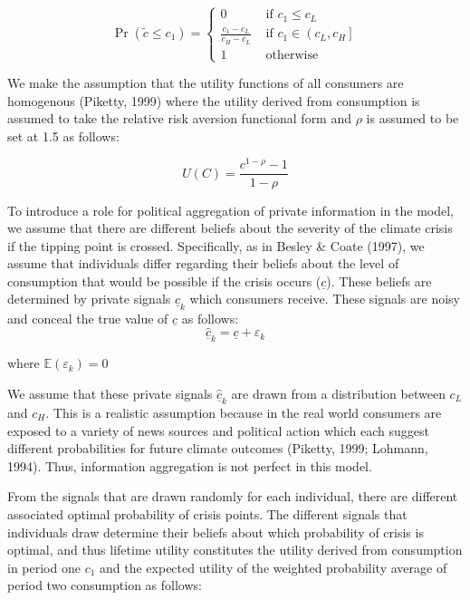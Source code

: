 \documentclass[11pt,preprint, authoryear]{elsarticle}
\numberwithin{equation}{section}
\numberwithin{figure}{section}
\numberwithin{table}{section}
\begin{document}
\[
\operatorname{Pr}\left(\tilde{c} \leq c_1\right)=\left\{\begin{array}{cc}
0 & \text { if } c_1 \leq c_L \\
\frac{c_1-c_L}{c_H-c_L} & \text { if } c_1 \in\left(c_L, c_H\right] \\
1 & \text { otherwise }
\end{array}\right.
\]

We make the assumption that the utility functions of all consumers are
homogenous (Piketty, 1999) where the utility derived from consumption is
assumed to take the relative risk aversion functional form and \(\rho\)
is assumed to be set at 1.5 as follows:

\[
U(C)=\frac{c^{1-\rho}-1}{1-\rho}
\]

To introduce a role for political aggregation of private information in
the model, we assume that there are different beliefs about the severity
of the climate crisis if the tipping point is crossed. Specifically, as
in Besley \& Coate (1997), we assume that individuals differ regarding
their beliefs about the level of consumption that would be possible if
the crisis occurs (\(\underline{c}\)). These beliefs are determined by
private signals \(\hat{\underline{c}}_k\) which consumers receive. These
signals are noisy and conceal the true value of \(\underline{c}\) as
follows: \[
\hat{\underline{c}}_k=\underline{c}+\varepsilon_k
\]

\begin{center}
where  $\mathbb{E}\left(\varepsilon_k\right)=0$ 
\end{center}

We assume that these private signals \(\hat{\underline{c}}_k\) are drawn
from a distribution between \(c_L\) and \(c_H\). This is a realistic
assumption because in the real world consumers are exposed to a variety
of news sources and political action which each suggest different
probabilities for future climate outcomes (Piketty, 1999; Lohmann,
1994). Thus, information aggregation is not perfect in this model.

From the signals that are drawn randomly for each individual, there are
different associated optimal probability of crisis points. The different
signals that individuals draw determine their beliefs about which
probability of crisis is optimal, and thus lifetime utility constitutes
the utility derived from consumption in period one \(c_1\) and the
expected utility of the weighted probability average of period two
consumption as follows:
\end{document}
